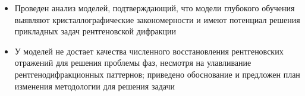 \documentclass[a4paper,12pt]{article}
\begin{document}
{\begin{itemize}
\item Проведен анализ моделей, подтверждающий, что модели глубокого обучения выявляют кристаллографические закономерности и имеют потенциал решения прикладных задач рентгеновской дифракции

\item У моделей не достает качества численного восстановления рентгеновских отражений для решения проблемы фаз, несмотря на улавливание рентгенодифракционных паттернов; приведено обоснование и предложен план изменения методологии для решения задачи

\end{itemize}
}


\end{document}
